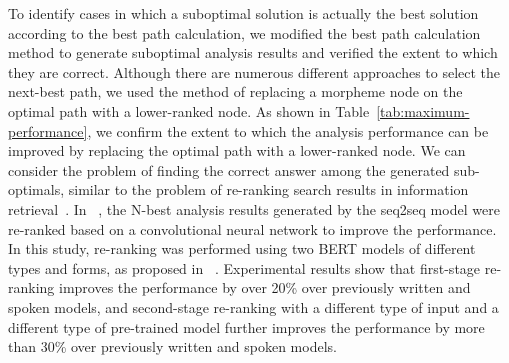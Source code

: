 \documentclass[AMS,STIX2COL]{WileyNJD-v2}
\begin{document}
    To identify cases in which a suboptimal solution is actually the best solution according to the best path calculation, we modified the best path calculation method to generate suboptimal analysis results and verified the extent to which they are correct.
    Although there are numerous different approaches to select the next-best path, we used the method of replacing a morpheme node on the optimal path with a lower-ranked node.
    As shown in Table~\ref{tab:maximum-performance}, we confirm the extent to which the analysis performance can be improved by replacing the optimal path with a lower-ranked node.
    We can consider the problem of finding the correct answer among the generated sub-optimals, similar to the problem of re-ranking search results in information retrieval~\cite{BaeYJ2021}.
    In ~\cite{ChoiYS2018}, the N-best analysis results generated by the seq2seq model were re-ranked based on a convolutional neural network to improve the performance.
    In this study, re-ranking was performed using two BERT models of different types and forms, as proposed in ~\cite{Nogueira2019}.
    Experimental results show that first-stage re-ranking improves the performance by over 20\% over previously written and spoken models, and second-stage re-ranking with a different type of input and a different type of pre-trained model further improves the performance by more than 30\% over previously written and spoken models.
\end{document}
